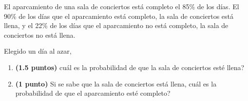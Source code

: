 
El aparcamiento de una sala de conciertos está completo el 85\% de los días. El 90\% de los días que el aparcamiento está completo, la sala de conciertos está llena, y el 22\% de los días que el aparcamiento no está completo, la sala de conciertos no está llena.

Elegido un día al azar,
\begin{enumerate}[label=\alph*)]
\item \textbf{(1.5 puntos)} \textquestiondown{}cuál es la probabilidad de que la sala de conciertos esté llena?
\item \textbf{(1 punto)} Si se sabe que la sala de conciertos está llena, \textquestiondown{}cuál es la probabilidad de que el aparcamiento esté completo?
\end{enumerate}

